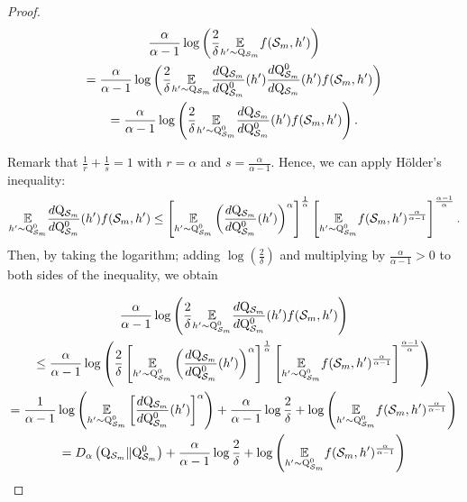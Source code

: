 \begin{noaddcontents}
\begin{proof}
\begin{multline*}
 \frac{\alpha}{\alpha-1} \log \left(\frac{2}{\delta} \underset{h^{\prime} \sim \mathrm{Q}_{\mathcal{S}_m}}{\mathbb{E}} f(\mathcal{S}_m,h')\right) \\ =\frac{\alpha}{\alpha-1} \log \left(\frac{2}{\delta} \underset{h^{\prime} \sim \mathrm{Q}_{\mathcal{S}_m}}{\mathbb{E}} \frac{d\mathrm{Q}_{\mathcal{S}_m}}{d\mathrm{Q}_{\mathcal{S}_m}^0}(h')\frac{d\mathrm{Q}_{\mathcal{S}_m}^0}{d\mathrm{Q}_{\mathcal{S}_m}}(h') f(\mathcal{S}_m,h') \right) \\
 =\frac{\alpha}{\alpha-1} \log \left(\frac{2}{\delta} \underset{h^{\prime} \sim \mathrm{Q}_{\mathcal{S}_m}^0}{\mathbb{E}} \frac{d\mathrm{Q}_{\mathcal{S}_m}}{d\mathrm{Q}_{\mathcal{S}_m}^0}(h') f(\mathcal{S}_m,h')\right) .
\end{multline*}

Remark that $\frac{1}{r}+\frac{1}{s}=1$ with $r=\alpha$ and $s=\frac{\alpha}{\alpha-1}$. Hence, we can apply Hölder's inequality:
$$
\underset{h^{\prime} \sim \mathrm{Q}_{\mathcal{S}_m}^0}{\mathbb{E}} \frac{d\mathrm{Q}_{\mathcal{S}_m}}{d\mathrm{Q}_{\mathcal{S}_m}^0}(h') f(\mathcal{S}_m,h') \leq\left[\underset{h^{\prime} \sim \mathrm{Q}_{\mathcal{S}_m}^0}{\mathbb{E}}\left(\frac{d\mathrm{Q}_{\mathcal{S}_m}}{d\mathrm{Q}_{\mathcal{S}_m}^0}(h')\right)^{\alpha}\right]^{\frac{1}{\alpha}}\left[\underset{h^{\prime} \sim \mathrm{Q}_{\mathcal{S}_m}^0}{\mathbb{E}} f(\mathcal{S}_m,h')^{\frac{\alpha}{\alpha-1}}\right]^{\frac{\alpha-1}{\alpha}} .
$$
Then, by taking the logarithm; adding $\log \left(\frac{2}{\delta}\right)$ and multiplying by $\frac{\alpha}{\alpha-1}>0$ to both sides of the inequality, we obtain

\begin{multline*}
\frac{\alpha}{\alpha-1} \log \left(\frac{2}{\delta} \underset{h^{\prime} \sim \mathrm{Q}_{\mathcal{S}_m}^0}{\mathbb{E}} \frac{d\mathrm{Q}_{\mathcal{S}_m}}{d\mathrm{Q}_{\mathcal{S}_m}^0}(h') f(\mathcal{S}_m,h')\right) \\
\leq \frac{\alpha}{\alpha-1} \log \left(\frac{2}{\delta}\left[\underset{h^{\prime} \sim \mathrm{Q}_{\mathcal{S}_m}^0}{\mathbb{E}}\left(\frac{d\mathrm{Q}_{\mathcal{S}_m}}{d\mathrm{Q}_{\mathcal{S}_m}^0}(h')\right)^{\alpha}\right]^{\frac{1}{\alpha}}\left[\underset{h^{\prime} \sim \mathrm{Q}_{\mathcal{S}_m}^0}{\mathbb{E}} f(\mathcal{S}_m,h')^{\frac{\alpha}{\alpha-1}}\right]^{\frac{\alpha-1}{\alpha}}\right) \\
 =\frac{1}{\alpha-1} \log \left(\underset{h^{\prime} \sim \mathrm{Q}_{\mathcal{S}_m}^0}{\mathbb{E}}\left[\frac{d\mathrm{Q}_{\mathcal{S}_m}}{d\mathrm{Q}_{\mathcal{S}_m}^0}(h')\right]^{\alpha}\right)+\frac{\alpha}{\alpha-1} \log \frac{2}{\delta}+\log \left(\underset{h^{\prime} \sim \mathrm{Q}_{\mathcal{S}_m}^0}{\mathbb{E}} f(\mathcal{S}_m,h')^{\frac{\alpha}{\alpha-1}}\right) \\
=D_{\alpha}\left(\mathrm{Q}_{\mathcal{S}_m} \| \mathrm{Q}_{\mathcal{S}_m}^0\right)+\frac{\alpha}{\alpha-1} \log \frac{2}{\delta}+\log \left(\underset{h^{\prime} \sim \mathrm{Q}_{\mathcal{S}_m}^0}{\mathbb{E}} f(\mathcal{S}_m,h')^{\frac{\alpha}{\alpha-1}}\right)
\end{multline*}


\end{proof}
\end{noaddcontents}
